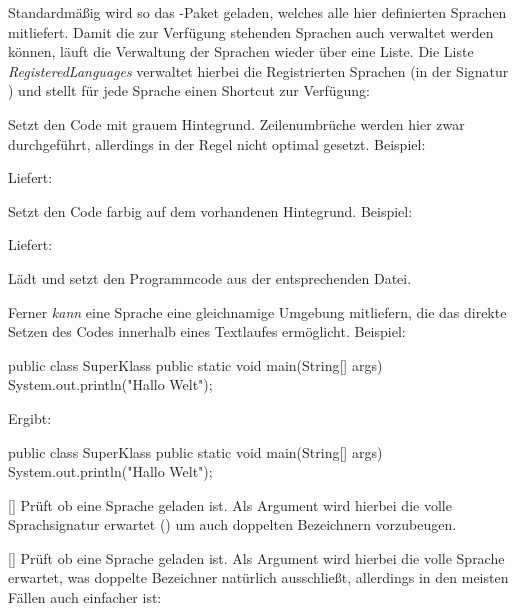 Standardmäßig wird so das -Paket geladen, welches alle hier definierten Sprachen mitliefert. Damit die zur Verfügung stehenden Sprachen auch verwaltet werden können, läuft die Verwaltung der Sprachen wieder über eine Liste. Die Liste \emph{RegisteredLanguages} verwaltet hierbei die Registrierten Sprachen (in der Signatur ) und stellt für jede Sprache einen Shortcut zur Verfügung:\begin{ditemize}
    \item {} Setzt den Code mit grauem Hintegrund. Zeilenumbrüche werden hier zwar durchgeführt, allerdings in der Regel nicht optimal gesetzt. Beispiel: \begin{latex}
    \end{latex}
    Liefert: 
    \item {} Setzt den Code farbig auf dem vorhandenen Hintegrund. Beispiel: \begin{latex}
    \end{latex}
            Liefert: 
    \item {} Lädt und setzt den Programmcode aus der entsprechenden Datei.
\end{ditemize}
Ferner \emph{kann} eine Sprache eine gleichnamige Umgebung mitliefern, die das direkte Setzen des Codes innerhalb eines Textlaufes ermöglicht. Beispiel:
\begin{latex}
\begin{java}
public class SuperKlass {
    public static void main(String[] args) {
        System.out.println("Hallo Welt");
    }
}
\end{java}
\end{latex}
Ergibt:
\begin{java}
public class SuperKlass {
    public static void main(String[] args) {
        System.out.println("Hallo Welt");
    }
}
\end{java}

[]
Prüft ob eine Sprache geladen ist. Als Argument wird hierbei die volle Sprachsignatur erwartet () um auch doppelten Bezeichnern vorzubeugen.

[]
Prüft ob eine Sprache geladen ist. Als Argument wird hierbei die volle Sprache erwartet, was doppelte Bezeichner natürlich ausschließt, allerdings in den meisten Fällen auch einfacher ist:
\begin{latex}
\end{latex}

